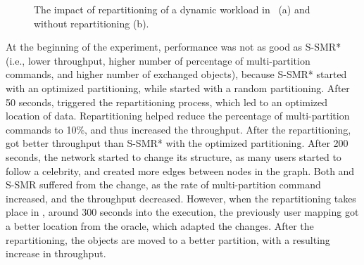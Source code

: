 \begin{figure}[h!]
\begin{subfigure}{.42\textwidth}
    \caption{}
  \end{subfigure}
  \caption{The impact of repartitioning of a dynamic workload in \dynastar~(a) and \ssmr without repartitioning (b).}%
  \label{fig:socialcelebrity}
\end{figure}

At the beginning of the experiment, \dynastar performance was not as good as S-SMR* (i.e., lower throughput, higher number of
percentage of multi-partition commands, and higher number of exchanged objects), because S-SMR* started with an optimized
partitioning, while \dynastar started with a random partitioning. 
After 50 seconds, \dynastar triggered the repartitioning process, which led to an optimized location of data. Repartitioning helped
reduce the percentage of multi-partition commands to 10\%, and thus increased the throughput. After the repartitioning, \dynastar got better
throughput than S-SMR* with the optimized partitioning.
After 200 seconds, the network started to change its structure, as many users started to follow a celebrity, and created more edges
between nodes in the graph. Both \dynastar and S-SMR suffered from the change, as the rate of multi-partition command increased, and the throughput
decreased. However, when the repartitioning takes place in \dynastar, around 300 seconds into the execution, the previously user mapping
got a better location from the oracle, which adapted the changes. After the repartitioning, the objects are moved to a better partition, with a resulting increase in throughput.


